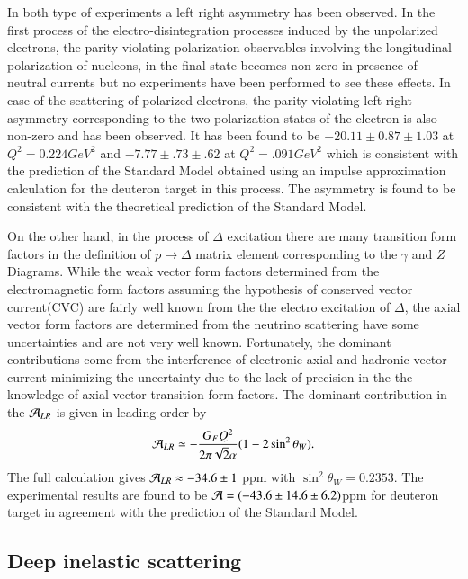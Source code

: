 In both type of experiments a left right asymmetry has been observed. In the first process of the electro-disintegration  processes induced by the unpolarized electrons,  the parity violating polarization observables involving the longitudinal polarization of nucleons, in the final state becomes non-zero in presence of neutral currents but no experiments have been  performed to see these effects. In case of the scattering of polarized electrons, the parity violating left-right asymmetry corresponding to the two polarization states of the electron is also non-zero and has been observed. It has been found to be
$-20.11\pm0.87\pm1.03$ at $Q^2=0.224GeV^2$ \cite{chap9-key23} and $-7.77\pm.73\pm.62$ at $Q^2=.091 GeV^2$ \cite{chap9-key24} which is consistent with the prediction of the Standard Model obtained using an impulse approximation calculation for the deuteron target in this process. The asymmetry is found to be consistent with the theoretical prediction of the Standard Model. 

 On the other hand,  in the process of $\Delta$  excitation there are many transition form factors in the definition of  $p\rightarrow \Delta $ matrix element corresponding to the  $\gamma$ and $Z$ Diagrams. While the weak vector form factors determined from the electromagnetic form factors assuming the hypothesis of conserved vector current(CVC) are fairly well known from the the electro excitation of $\Delta$,  the axial vector form factors are determined from the neutrino scattering have some uncertainties and are not very well known.  Fortunately,  the dominant contributions come from the interference of electronic axial and hadronic vector current  minimizing the uncertainty due to the lack of precision in the the knowledge of axial vector transition form factors.  The dominant contribution in the ${\cal A}_{LR}$   is given in leading order by  
\begin{equation}
 {\cal A}_{LR}\simeq -\frac{G_F Q^2}{2\pi\sqrt{2}\alpha}(1-2\sin^2\theta_W). \label{chap9-eq27}
\end{equation}
 The full calculation gives ${\cal A}_{LR}\approx-34.6\pm 1$ ppm with $\sin^2\theta_W=0.2353$. The experimental results are found to be ${\cal A}= (-43.6\pm14.6\pm6.2)$ppm for deuteron target \cite{chap9-key25} in agreement with the prediction of the Standard Model.

\subsection{Deep inelastic scattering}\label{chap9-subsec3.3}

